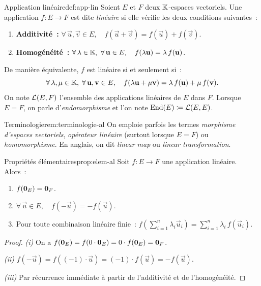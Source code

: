 \begin{definition}{Application linéaire}{def:app-lin}
  Soient $E$ et $F$ deux ${\mathbb{K}}$-espaces vectoriels. Une application
  $f\colon E\to F$ est dite \emph{linéaire}
  si elle vérifie les deux conditions suivantes~:
  \begin{enumerate}[label=(\roman*)]
    \item \textbf{Additivité~:} $\forall\, \vec{u},\vec{v}\in E,\quad
      f(\vec{u}+\vec{v})=f(\vec{u})+f(\vec{v})$.
    \item \textbf{Homogénéité~:} $\forall\,\lambda\in{\mathbb{K}},\;\forall\,
      \mathbf{u}\in E,\quad f(\lambda\mathbf{u})=\lambda\, f(\mathbf{u})$.
  \end{enumerate}
  De manière équivalente, $f$ est linéaire si et seulement si~:
  \[
    \forall\,\lambda,\mu\in{\mathbb{K}},\;\forall\,\mathbf{u},\mathbf{v}\in E,\quad
    f(\lambda\mathbf{u}+\mu\mathbf{v})=\lambda\,f(\mathbf{u})+\mu\,f(\mathbf{v}).
  \]
  On note ${\mathcal{L}}(E,F)$ l'ensemble des applications
  linéaires de $E$ dans $F$. Lorsque $E=F$, on parle d'\emph{endomorphisme}%
   et l'on note $\operatorname{End}(E)\coloneqq{\mathcal{L}}(E,E)$.
\end{definition}

\begin{remark}{Terminologie}{rem:terminologie-al}
  On emploie parfois les termes \emph{morphisme d'espaces vectoriels},
  \emph{opérateur linéaire} (surtout lorsque $E=F$) ou
  \emph{homomorphisme}. En anglais, on dit
  \emph{linear map} ou \emph{linear transformation}.
\end{remark}

\begin{proposition}{Propriétés élémentaires}{prop:elem-al}
  Soit $f\colon E\to F$ une application linéaire. Alors~:
  \begin{enumerate}[label=(\roman*)]
    \item $f(\mathbf{0}_E)=\mathbf{0}_F$.
    \item $\forall\,\vec{u}\in E,\quad f(-\vec{u})=-f(\vec{u})$.
    \item Pour toute combinaison linéaire finie~:
      $f\!\left(\displaystyle\sum_{i=1}^{n}\lambda_i\vec{u}_i\right)
      =\sum_{i=1}^{n}\lambda_i\,f(\vec{u}_i)$.
  \end{enumerate}
\end{proposition}

\begin{proof}
  \emph{(i)} On a $f(\mathbf{0}_E)=f(0\cdot\mathbf{0}_E)=0\cdot f(\mathbf{0}_E)
  =\mathbf{0}_F$.

  \emph{(ii)} $f(-\vec{u})=f((-1)\cdot\vec{u})=(-1)\cdot f(\vec{u})
  =-f(\vec{u})$.

  \emph{(iii)} Par récurrence immédiate à partir de l'additivité et de
  l'homogénéité.
\end{proof}

